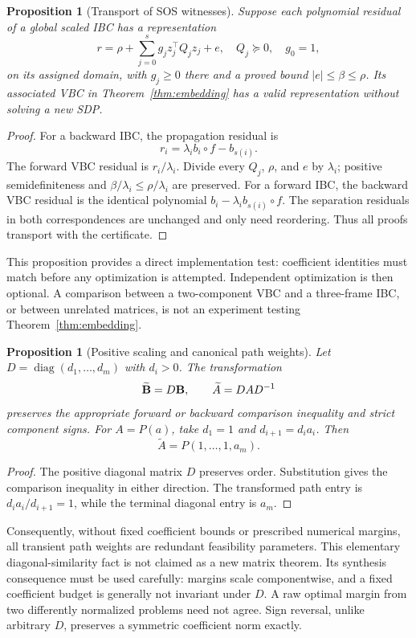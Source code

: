 \documentclass[5p,times]{elsarticle}
\newtheorem{proposition}[theorem]{Proposition}
\theoremstyle{definition}\newtheorem{definition}[theorem]{Definition}
\theoremstyle{remark}\newtheorem{remark}[theorem]{Remark}
\newcommand{\diag}{\operatorname{diag}}
\begin{document}
\begin{proposition}[Transport of SOS witnesses]\label{prop:transport}
Suppose each polynomial residual of a global scaled IBC has a representation
\begin{equation}\label{eq:representation}
 r=\rho+\sum_{j=0}^s g_j z_j^\top Q_j z_j+e,
 \quad Q_j\succeq0,\quad g_0=1,
\end{equation}
on its assigned domain, with $g_j\ge0$ there and a proved bound $|e|\le\beta\le\rho$. Its associated VBC in Theorem~\ref{thm:embedding} has a valid representation without solving a new SDP.
\end{proposition}
\begin{proof}
For a backward IBC, the propagation residual is
\[
 r_i=\lambda_i b_i\circ f-b_{s(i)}.
\]
The forward VBC residual is $r_i/\lambda_i$. Divide every $Q_j$, $\rho$, and $e$ by $\lambda_i$; positive semidefiniteness and $\beta/\lambda_i\le\rho/\lambda_i$ are preserved. For a forward IBC, the backward VBC residual is the identical polynomial $b_i-\lambda_i b_{s(i)}\circ f$. The separation residuals in both correspondences are unchanged and only need reordering. Thus all proofs transport with the certificate.
\end{proof}

This proposition provides a direct implementation test: coefficient identities must match before any optimization is attempted. Independent optimization is then optional. A comparison between a two-component VBC and a three-frame IBC, or between unrelated matrices, is not an experiment testing Theorem~\ref{thm:embedding}.

\begin{proposition}[Positive scaling and canonical path weights]\label{prop:scaling}
Let $D=\diag(d_1,\ldots,d_m)$ with $d_i>0$. The transformation
\[
 \widetilde{\mathbf B}=D\mathbf B,\qquad \widetilde A=DAD^{-1}
\]
preserves the appropriate forward or backward comparison inequality and strict component signs. For $A=P(a)$, take $d_1=1$ and $d_{i+1}=d_i a_i$. Then
\[
 \widetilde A=P(1,\ldots,1,a_m).
\]
\end{proposition}
\begin{proof}
The positive diagonal matrix $D$ preserves order. Substitution gives the comparison inequality in either direction. The transformed path entry is $d_i a_i/d_{i+1}=1$, while the terminal diagonal entry is $a_m$.
\end{proof}
Consequently, without fixed coefficient bounds or prescribed numerical margins, all transient path weights are redundant feasibility parameters. This elementary diagonal-similarity fact is not claimed as a new matrix theorem. Its synthesis consequence must be used carefully: margins scale componentwise, and a fixed coefficient budget is generally not invariant under $D$. A raw optimal margin from two differently normalized problems need not agree. Sign reversal, unlike arbitrary $D$, preserves a symmetric coefficient norm exactly.
\end{document}
